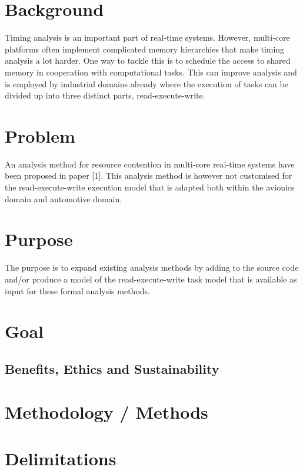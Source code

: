 \documentclass{kththesis}
\begin{document}
\section{Background} 

Timing analysis is an important part of real-time systems. However, multi-core platforms often
implement complicated memory hierarchies that make timing analysis a lot harder. One way to tackle
this is to schedule the access to shared memory in cooperation with computational tasks. This can
improve analysis and is employed by industrial domains already where the execution of tasks can be
divided up into three distinct parts, read-execute-write.


\section{Problem}

An analysis method for resource contention in multi-core real-time systems have been proposed in
paper [1]. This analysis method is however not customised for the read-execute-write execution model
that is adapted both within the avionics domain and automotive domain.


\section{Purpose}

The purpose is to expand existing analysis methods by adding to the source code and/or produce a
model of the read-execute-write task model that is available as input for these formal analysis
methods.


\section{Goal}



\subsection{Benefits, Ethics and Sustainability}

\section{Methodology / Methods}

\section{Delimitations}
\end{document}
